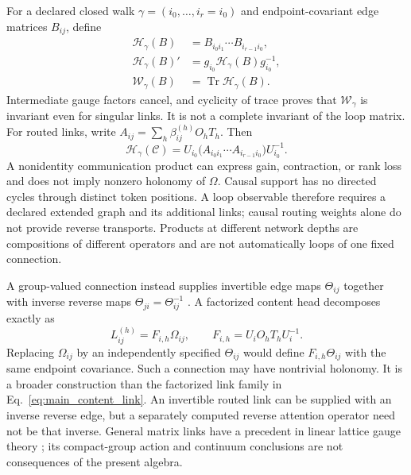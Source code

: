\documentclass[twoside,11pt]{article}
\begin{document}
For a declared closed walk \(\gamma=(i_0,\ldots,i_r=i_0)\) and endpoint-covariant edge matrices \(B_{ij}\), define
\begin{align}
\mathcal H_\gamma(B)&=B_{i_0i_1}\cdots B_{i_{r-1}i_0},\\
\mathcal H_\gamma(B)'&=g_{i_0}\mathcal H_\gamma(B)g_{i_0}^{-1},\\
\mathcal W_\gamma(B)&=\operatorname{Tr}\mathcal H_\gamma(B).
\label{eq:main_matrix_loop_trace}
\end{align}
Intermediate gauge factors cancel, and cyclicity of trace proves that \(\mathcal W_\gamma\) is invariant even for singular links. It is not a complete invariant of the loop matrix. For routed links, write \(A_{ij}=\sum_h\beta_{ij}^{(h)}O_hT_h\). Then
\begin{equation}
\mathcal H_\gamma(\mathcal C)
=U_{i_0}\bigl(A_{i_0i_1}\cdots A_{i_{r-1}i_0}\bigr)U_{i_0}^{-1}.
\label{eq:main_routed_loop_body}
\end{equation}
A nonidentity communication product can express gain, contraction, or rank loss and does not imply nonzero holonomy of \(\Omega\). Causal support has no directed cycles through distinct token positions. A loop observable therefore requires a declared extended graph and its additional links; causal routing weights alone do not provide reverse transports. Products at different network depths are compositions of different operators and are not automatically loops of one fixed connection.

A group-valued connection instead supplies invertible edge maps $\Theta_{ij}$ together with inverse reverse maps $\Theta_{ji}=\Theta_{ij}^{-1}$ \citep{WilsonConfinement1974}. A factorized content head decomposes exactly as
\begin{equation}
L_{ij}^{(h)}=F_{i,h}\Omega_{ij},\qquad
F_{i,h}=U_iO_hT_hU_i^{-1}.
\label{eq:main_processing_transport}
\end{equation}
Replacing $\Omega_{ij}$ by an independently specified $\Theta_{ij}$ would define $F_{i,h}\Theta_{ij}$ with the same endpoint covariance. Such a connection may have nontrivial holonomy. It is a broader construction than the factorized link family in Eq.~\eqref{eq:main_content_link}. An invertible routed link can be supplied with an inverse reverse edge, but a separately computed reverse attention operator need not be that inverse. General matrix links have a precedent in linear lattice gauge theory \citep{Wetterich2014LinearLattice}; its compact-group action and continuum conclusions are not consequences of the present algebra.
\end{document}
